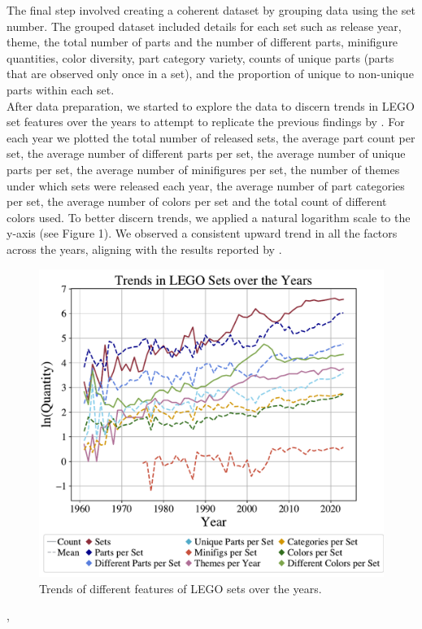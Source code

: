\documentclass{article}
\theoremstyle{plain}
\theoremstyle{definition}
\theoremstyle{remark}
\begin{document}
The final step involved creating a coherent dataset by grouping data using the set number. The grouped dataset included details for each set such as release year, theme, the total number of parts and the number of different parts, minifigure quantities, color diversity, part category variety, counts of unique parts (parts that are observed only once in a set), and the proportion of unique to non-unique parts within each set.\\
After data preparation, we started to explore the data to discern trends in LEGO set features over the years to attempt to replicate the previous findings by \citet{legocomplexity}. For each year we plotted the total number of released sets, the average part count per set, the average number of different parts per set, the average number of unique parts per set, the average number of minifigures per set, the number of themes under which sets were released each year, the average number of part categories per set, the average number of colors per set and the total count of different colors used. To better discern trends, we applied a natural logarithm scale to the y-axis (see Figure 1). We observed a consistent upward trend in all the factors across the years, aligning with the results reported by \citet{legocomplexity}.\\
\begin{figure}[ht]
 \vskip 0.2in
 \begin{center}
 \centerline{\includegraphics[width=\columnwidth]{../Images/Exploration.pdf}}
\caption{Trends of different features of LEGO sets over the years.}
\label{icml-historical}
 \end{center}
 \vskip -0.2in
\end{figure}
\vfill\eject,
\end{document}
